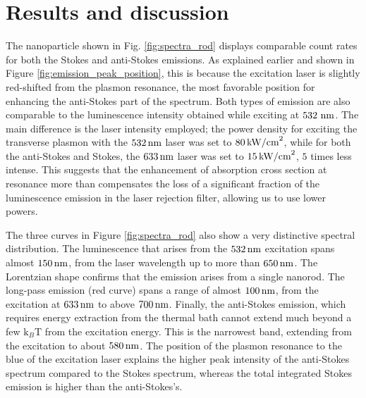 \section{Results and discussion}

The nanoparticle shown in Fig. \ref{fig:spectra_rod} displays comparable count
rates for both the Stokes and anti-Stokes emissions. As explained earlier and
shown in Figure \ref{fig:emission_peak_position}, this is because the excitation
laser is slightly red-shifted from the plasmon resonance, the most favorable
position for enhancing the anti-Stokes part of the spectrum. Both types of
emission are also comparable to the luminescence intensity obtained while
exciting at $532\,\,\textrm{nm}$. The main difference is the laser intensity employed; the
power density for exciting the transverse plasmon with the $532\,\textrm{nm}$ laser was
set to $80\,\textrm{kW/cm}^2$, while for both the anti-Stokes and Stokes, the $633\,\textrm{nm}$ laser
was set to $15\,\textrm{kW/cm}^2$, $5$ times less intense. This suggests that the enhancement
of absorption cross section at resonance more than compensates the loss of a
significant fraction of the luminescence emission in the laser rejection filter,
allowing us to use lower powers.

The three curves in Figure \ref{fig:spectra_rod} also show a very distinctive
spectral distribution. The luminescence that arises from the $532\,\textrm{nm}$ excitation
spans almost $150\,\textrm{nm}$, from the laser wavelength up to more than $650\,\textrm{nm}$. The
Lorentzian shape confirms that the emission arises from a single nanorod. The
long-pass emission (red curve) spans a range of almost $100\,\textrm{nm}$, from the
excitation at $633\,\textrm{nm}$ to above $700\,\textrm{nm}$. Finally, the anti-Stokes emission,
which requires energy extraction from the thermal bath cannot extend much beyond
a few $\textrm{k}_{B}\textrm{T}$ from the excitation energy. This is the
narrowest band, extending from the excitation to about $580\,\textrm{nm}$. The position of
the plasmon resonance to the blue of the excitation laser explains the higher
peak intensity of the anti-Stokes spectrum compared to the Stokes spectrum,
whereas the total integrated Stokes emission is higher than the anti-Stokes's.

